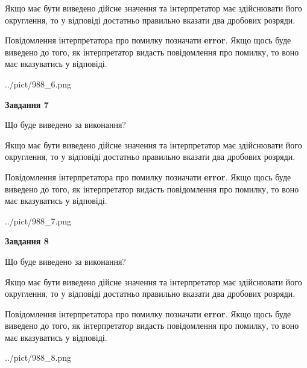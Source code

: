 \documentclass[12pt, ukrainian]{article}
\begin{document}
{\begin {Large}
Якщо має бути виведено дійсне значення та інтерпретатор має здійснювати його округлення, 
то у відповіді достатньо правильно вказати два дробових розряди.

Повідомлення інтерпретатора про помилку позначати \textbf{error}.
Якщо щось буде виведено до того, як інтерпретатор видасть повідомлення про помилку, 
то воно має вказуватись у відповіді. \par

\begin{center}
	{../pict/988_6.png}
\end{center}
\newpage

{\begin {center}\textbf{Завдання 7}\end {center}}\par
Що буде виведено за виконання? \par

Якщо має бути виведено дійсне значення та інтерпретатор має здійснювати його округлення, 
то у відповіді достатньо правильно вказати два дробових розряди.

Повідомлення інтерпретатора про помилку позначати \textbf{error}.
Якщо щось буде виведено до того, як інтерпретатор видасть повідомлення про помилку, 
то воно має вказуватись у відповіді. \par

\begin{center}
	{../pict/988_7.png}
\end{center}
\newpage

{\begin {center}\textbf{Завдання 8}\end {center}}\par
Що буде виведено за виконання? \par

Якщо має бути виведено дійсне значення та інтерпретатор має здійснювати його округлення, 
то у відповіді достатньо правильно вказати два дробових розряди.

Повідомлення інтерпретатора про помилку позначати \textbf{error}.
Якщо щось буде виведено до того, як інтерпретатор видасть повідомлення про помилку, 
то воно має вказуватись у відповіді. \par

\begin{center}
	{../pict/988_8.png}
\end{center}
\newpage


\end{Large}}
\end{document}
